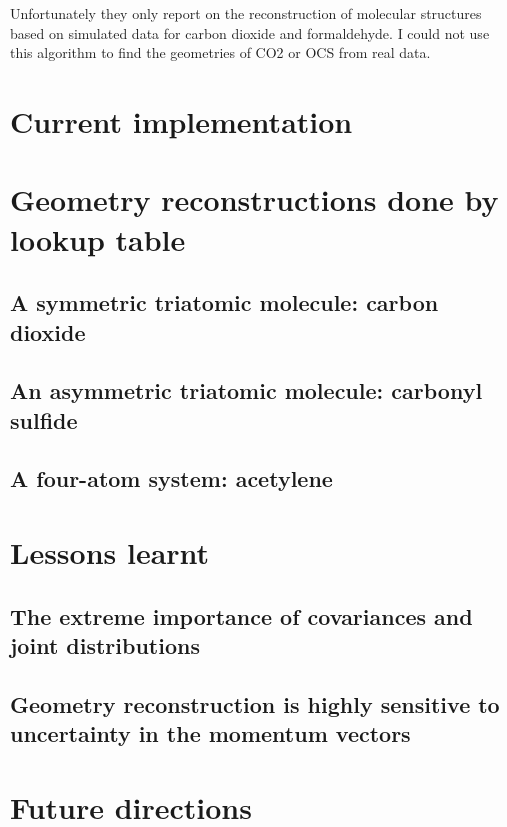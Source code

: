 
Unfortunately they only report on the reconstruction of molecular structures based on simulated data for carbon dioxide and formaldehyde. I could not use this algorithm to find the geometries of CO2 or OCS from real data.

\section{Current implementation}

\section{Geometry reconstructions done by lookup table}
\subsection{A symmetric triatomic molecule: carbon dioxide}
\subsection{An asymmetric triatomic molecule: carbonyl sulfide}
\subsection{A four-atom system: acetylene}

\section{Lessons learnt}
\subsection{The extreme importance of covariances and joint distributions}
\subsection{Geometry reconstruction is highly sensitive to uncertainty in the momentum vectors}

\section{Future directions}